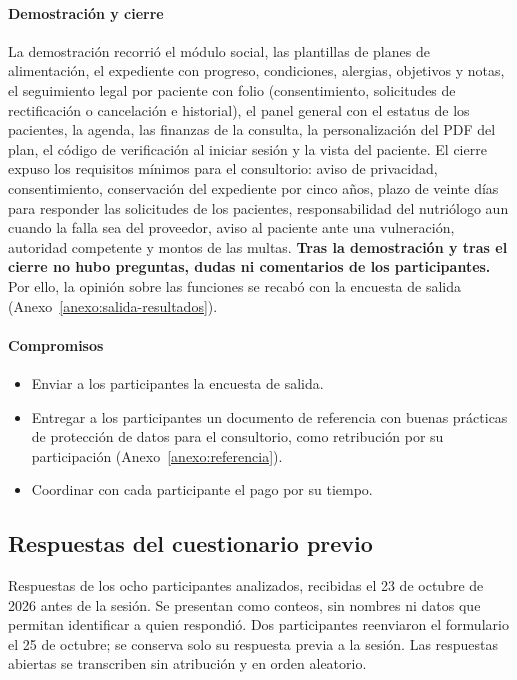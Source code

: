 \documentclass[12pt, a4paper]{article}
\begin{document}
\paragraph{Demostración y cierre}
La demostración recorrió el módulo social, las plantillas de planes de alimentación, el expediente con progreso, condiciones, alergias, objetivos y notas, el seguimiento legal por paciente con folio (consentimiento, solicitudes de rectificación o cancelación e historial), el panel general con el estatus de los pacientes, la agenda, las finanzas de la consulta, la personalización del PDF del plan, el código de verificación al iniciar sesión y la vista del paciente. El cierre expuso los requisitos mínimos para el consultorio: aviso de privacidad, consentimiento, conservación del expediente por cinco años, plazo de veinte días para responder las solicitudes de los pacientes, responsabilidad del nutriólogo aun cuando la falla sea del proveedor, aviso al paciente ante una vulneración, autoridad competente y montos de las multas. \textbf{Tras la demostración y tras el cierre no hubo preguntas, dudas ni comentarios de los participantes.} Por ello, la opinión sobre las funciones se recabó con la encuesta de salida (Anexo~\ref{anexo:salida-resultados}).

\paragraph{Compromisos}
\begin{itemize}[leftmargin=*,itemsep=1pt]
  \item Enviar a los participantes la encuesta de salida.
  \item Entregar a los participantes un documento de referencia con buenas prácticas de protección de datos para el consultorio, como retribución por su participación (Anexo~\ref{anexo:referencia}).
  \item Coordinar con cada participante el pago por su tiempo.
\end{itemize}

\subsection{Respuestas del cuestionario previo}
\label{anexo:previo-resultados}

Respuestas de los ocho participantes analizados, recibidas el 23 de octubre de 2026 antes de la sesión. Se presentan como conteos, sin nombres ni datos que permitan identificar a quien respondió. Dos participantes reenviaron el formulario el 25 de octubre; se conserva solo su respuesta previa a la sesión. Las respuestas abiertas se transcriben sin atribución y en orden aleatorio.
\end{document}
